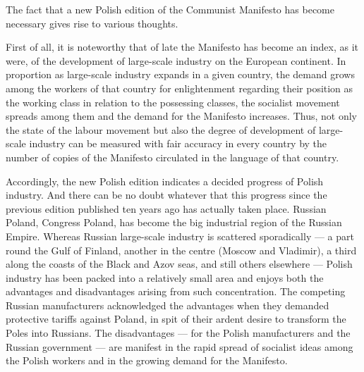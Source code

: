 The fact that a new Polish edition of the Communist Manifesto has become necessary gives rise to various thoughts.

First of all, it is noteworthy that of late the Manifesto has become an index, as it were, of the development of large-scale industry on the European continent. In proportion as large-scale industry expands in a given country, the demand grows among the workers of that country for enlightenment regarding their position as the working class in relation to the possessing classes, the socialist movement spreads among them and the demand for the Manifesto increases. Thus, not only the state of the labour movement but also the degree of development of large-scale industry can be measured with fair accuracy in every country by the number of copies of the Manifesto circulated in the language of that country.

Accordingly, the new Polish edition indicates a decided progress of Polish industry. And there can be no doubt whatever that this progress since the previous edition published ten years ago has actually taken place. Russian Poland, Congress Poland, has become the big industrial region of the Russian Empire. Whereas Russian large-scale industry is scattered sporadically --- a part round the Gulf of Finland, another in the centre (Moscow and Vladimir), a third along the coasts of the Black and Azov seas, and still others elsewhere --- Polish industry has been packed into a relatively small area and enjoys both the advantages and disadvantages arising from such concentration. The competing Russian manufacturers acknowledged the advantages when they demanded protective tariffs against Poland, in spit of their ardent desire to transform the Poles into Russians. The disadvantages --- for the Polish manufacturers and the Russian government --- are manifest in the rapid spread of socialist ideas among the Polish workers and in the growing demand for the Manifesto.

